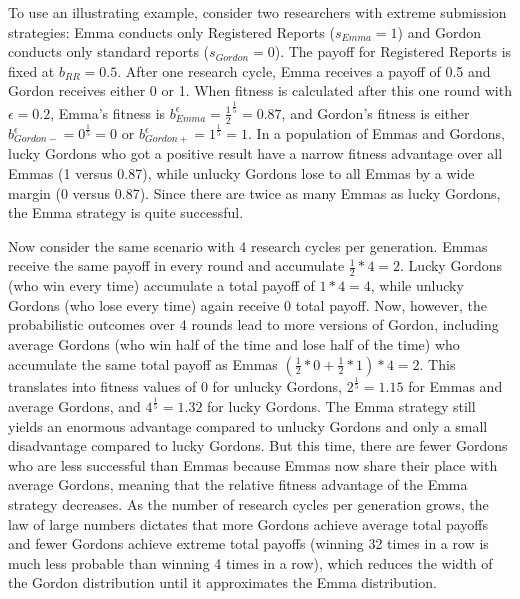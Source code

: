 \documentclass[british,,man,mask,floatsintext]{apa6}
\begin{document}
To use an illustrating example, consider two researchers with extreme submission strategies:
Emma conducts only Registered Reports (\(s_{Emma} = 1\)) and Gordon conducts only standard reports (\(s_{Gordon} = 0\)).
The payoff for Registered Reports is fixed at \(b_{RR} = 0.5\).
After one research cycle, Emma receives a payoff of 0.5 and Gordon receives either 0 or 1.
When fitness is calculated after this one round with \(\epsilon = 0.2\), Emma's fitness is \(b_{Emma}^{\epsilon} = \frac{1}{2}^{\frac{1}{5}} = 0.87\), and Gordon's fitness is either \(b_{Gordon-}^{\epsilon} = 0^{\frac{1}{5}} = 0\) or \(b_{Gordon+}^{\epsilon} = 1^{\frac{1}{5}} = 1\).
In a population of Emmas and Gordons, lucky Gordons who got a positive result have a narrow fitness advantage over all Emmas (1 versus 0.87), while unlucky Gordons lose to all Emmas by a wide margin (0 versus 0.87).
Since there are twice as many Emmas as lucky Gordons, the Emma strategy is quite successful.

Now consider the same scenario with 4 research cycles per generation.
Emmas receive the same payoff in every round and accumulate \(\frac{1}{2} * 4 = 2\).
Lucky Gordons (who win every time) accumulate a total payoff of \(1*4 = 4\), while unlucky Gordons (who lose every time) again receive 0 total payoff.
Now, however, the probabilistic outcomes over 4 rounds lead to more versions of Gordon, including average Gordons (who win half of the time and lose half of the time) who accumulate the same total payoff as Emmas \((\frac{1}{2}*0 + \frac{1}{2}*1)*4 = 2\).
This translates into fitness values of 0 for unlucky Gordons, \(2^{\frac{1}{5}} = 1.15\) for Emmas and average Gordons, and \(4^{\frac{1}{5}} = 1.32\) for lucky Gordons.
The Emma strategy still yields an enormous advantage compared to unlucky Gordons and only a small disadvantage compared to lucky Gordons.
But this time, there are fewer Gordons who are less successful than Emmas because Emmas now share their place with average Gordons, meaning that the relative fitness advantage of the Emma strategy decreases.
As the number of research cycles per generation grows, the law of large numbers dictates that more Gordons achieve average total payoffs and fewer Gordons achieve extreme total payoffs (winning 32 times in a row is much less probable than winning 4 times in a row), which reduces the width of the Gordon distribution until it approximates the Emma distribution.
\end{document}
